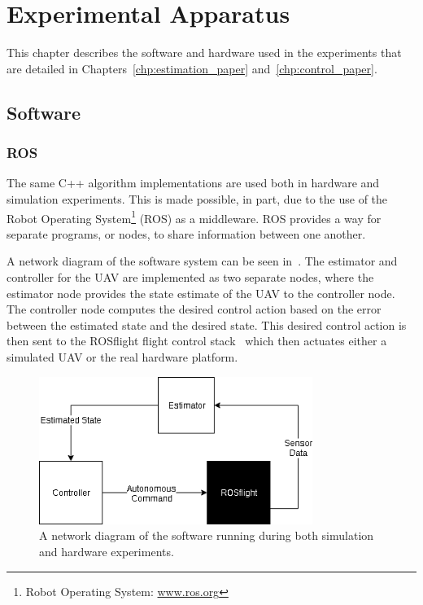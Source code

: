 
\chapter{Experimental Apparatus}
\label{chp:experimental_apparatus}

This chapter describes the software and hardware used in the experiments that
are detailed in Chapters~\ref{chp:estimation_paper} and~\ref{chp:control_paper}.

\section{Software}
\subsection {ROS}
The same C++ algorithm implementations are used both in hardware and simulation
experiments.
This is made possible, in part, due to the use of the Robot Operating System\footnote{Robot Operating System:
\href{www.ros.org}{www.ros.org}} (ROS) as a middleware. ROS provides a way for separate
programs, or nodes, to share information between one another.

A network diagram of the software system can be seen in~. The estimator and
controller for the UAV are implemented as two separate nodes, where the
estimator node provides the state estimate of the UAV to the controller node.
The controller node computes the desired control action based on the error
between the estimated state and the desired state. This desired control action
is then sent to the ROSflight flight control stack~\cite{jackson2016rosflight}
which then actuates either a simulated UAV or the real hardware platform.

\begin{figure}[htbp]
  \centering
  \includegraphics[width=3.5in]{figures/roscopter.png}
  \caption[Software Architecture Network Diagram]{A network diagram of the
  software running during both simulation and hardware experiments.}
%
  \label{fig:network_diagram}
\end{figure}

